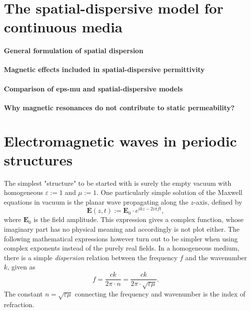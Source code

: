 \documentclass[letterpaper,12pt]{report}
\begin{document}
\section{The spatial-dispersive model for continuous media} %
\paragraph{General formulation of spatial dispersion}
\paragraph{Magnetic effects included in spatial-dispersive permittivity}
\paragraph{Comparison of eps-mu and spatial-dispersive models}
\paragraph{Why magnetic resonances do not contribute to static permeability?}

\section{Electromagnetic waves in periodic structures}
The simplest "structure" to be started with is surely the empty vacuum with homogeneous $\varepsilon := 1$ and $\mu := 1$. One particularly simple solution of the Maxwell equations in vacuum is the planar wave propagating along the $z$-axis, defined by%
\begin{equation} \mathbf{E}(z, t) := \mathbf{E}_0 \cdot e^{ikz- 2i\pi f t}, \label{eq_pw}\end{equation}
where $\mathbf{E}_0$ is the field amplitude.  This expression gives a complex function, whose imaginary part has no physical meaning and accordingly is not plot either. The following mathematical expressions however turn out to be simpler when using complex exponents instead of the purely real fields.
In a homogeneous medium, there is a simple \textit{dispersion} relation between the frequency  $f$ and the wavenumber $k$, given as
\begin{equation} f = \frac{ck}{2\pi \cdot n} = \frac{ck}{2\pi \cdot \sqrt{\varepsilon \mu}}. \label{eq_dispersion}\end{equation}
The constant $n = \sqrt{\varepsilon \mu}$ connecting the frequency and wavenumber is the index of refraction.
\end{document}
